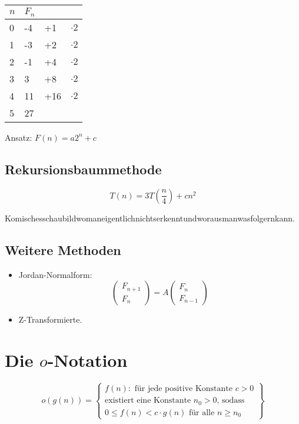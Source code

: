 \documentclass[a4paper]{scrartcl}
\begin{document}
\begin{tabular}{llll}
$n$ & $F_n$ \\
\hline
0 & -4 & +1  & $\cdot2$ \\
1 & -3 & +2 & $\cdot2$\\
2 & -1 & +4 & $\cdot2$\\
3 & 3 &+8 & $\cdot2$ \\
4 & 11 & +16 & $\cdot2$\\
5 & 27 & 
\end{tabular}

Ansatz: $F(n) = a2^n+c$

\subsection{Rekursionsbaummethode}

$$T(n) = 3 T \left(\frac{n}{4}\right) + cn^2 $$

Komischesschaubildwomaneigentlichnichtserkenntundworausmanwasfolgernkann.

\subsection{Weitere Methoden}
\begin{itemize}
\item Jordan-Normalform: $$\begin{pmatrix}F_{n+1} \\ F_{n}\end{pmatrix} = A\begin{pmatrix}F_n\\F_{n-1}\end{pmatrix}$$
\item Z-Transformierte.
\end{itemize}


\section{Die $o$-Notation}

$$o(g(n)) = \left\{ 
\begin{array}{l}
	f(n) : \text{ für jede positive Konstante }c>0  \\
	\text{existiert eine Konstante $n_0>0$, sodass }\\
	0\leq f(n) < c \cdot g(n) \text{ für alle } n \geq n_0
\end{array} \right\}$$
\end{document}
